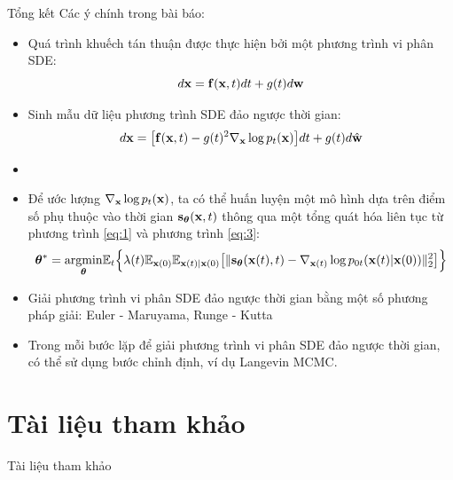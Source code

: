 \documentclass[10pt]{beamer}
\theoremstyle{remark}
\numberwithin{algocf}{section}
\numberwithin{equation}{section}
\numberwithin{dl}{section}
\numberwithin{figure}{section}
\begin{document}
\begin{frame}[shrink]{Tổng kết}
	Các ý chính trong bài báo:
	\begin{itemize}
		\item Quá trình khuếch tán thuận được thực hiện bởi một phương trình vi phân SDE:
		\begin{equation*}
			d \bold{x} = \bold{f} (\bold{x}, t) dt + g(t) d \bold{w}
		\end{equation*}
		\item Sinh mẫu dữ liệu phương trình SDE đảo ngược thời gian:
		\begin{equation*}
			d \bold{x} = \big \lbrack \bold{f}(\bold{x}, t) - g(t)^2 \nabla_{\bold{x}} \log p_t (\bold{x}) \big \rbrack dt + g(t) d \hat{\bold{w}}
		\end{equation*}
		\item \item Để ước lượng $\nabla_{\bold{x}} \log p_t(\bold{x})$, ta có thể huấn luyện một mô hình dựa trên điểm số phụ thuộc vào thời gian $\bold{s}_{\boldsymbol{\theta}}(\bold{x}, t)$ thông qua một tổng quát hóa liên tục từ phương trình \ref{eq:1} và phương trình \ref{eq:3}:
		\begin{equation*}
			\boldsymbol{\theta}^{\ast} = \underset{\boldsymbol{\theta}}{\mathrm{argmin}} \mathbb{E}_t \Big \lbrace  \lambda(t) \mathbb{E}_{\bold{x}(0)} \mathbb{E}_{\bold{x}(t) \vert \bold{x}(0)} \big \lbrack \lVert \bold{s}_{\boldsymbol{\theta}} (\bold{x}(t), t) - \nabla_{\bold{x}(t)} \log p_{0t} (\bold{x}(t) \vert \bold{x}(0)) \rVert_2^2 \big \rbrack \Big \rbrace
		\end{equation*}
		\item Giải phương trình vi phân SDE đảo ngược thời gian bằng một số phương pháp giải: Euler - Maruyama, Runge - Kutta
		\item Trong mỗi bước lặp để giải phương trình vi phân SDE đảo ngược thời gian, có thể sử dụng bước chỉnh định, ví dụ Langevin MCMC.
	\end{itemize}
\end{frame}

\section{Tài liệu tham khảo}
\begin{frame}[allowframebreaks]{Tài liệu tham khảo}
    \printbibliography
\end{frame}
\end{document}
